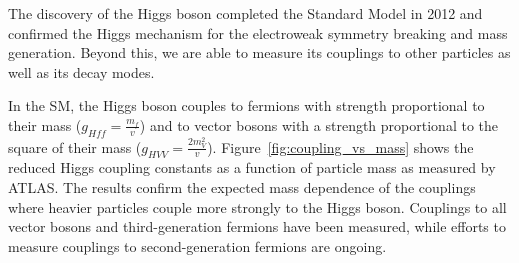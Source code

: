 The discovery of the Higgs boson completed the Standard Model in 2012 and confirmed the Higgs mechanism for the electroweak symmetry breaking and mass generation. Beyond this, we are able to measure its couplings to other particles as well as its decay modes.

\begin{figure}[pht]
  \centering
  \hspace{0.01\textwidth}
\end{figure}

In the SM, the Higgs boson couples to fermions with strength proportional to their mass ($g_{Hff} = \frac{m_{f}}{v}$) and to vector bosons with a strength proportional to the square of their mass ($g_{HVV} = \frac{2m_{V}^{2}}{v}$). Figure~\ref{fig:coupling_vs_mass} shows the reduced Higgs coupling constants as a function of particle mass as measured by ATLAS\@. The results confirm the expected mass dependence of the couplings where heavier particles couple more strongly to the Higgs boson. Couplings to all vector bosons and third-generation fermions have been measured, while efforts to measure couplings to second-generation fermions are ongoing.

